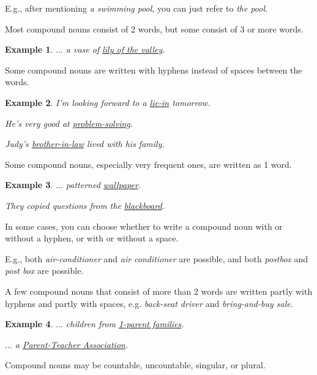 \documentclass[oneside]{book}
\numberwithin{equation}{section}
\newtheorem{example}{Example}[section]
\begin{document}
E.g., after mentioning \textit{a swimming pool}, you can just refer to \textit{the pool}.

%
Most compound nouns consist of 2 words, but some consist of 3 or more words.
\begin{example}
    $\ldots$ a vase of \underline{lily of the valley}.
\end{example}
%
\noindent{} Some compound nouns are written with hyphens instead of spaces between the words.
\begin{example}
    I'm looking forward to a \underline{lie-in} tomorrow.
    
    He's very good at \underline{problem-solving}.
    
    Judy's \underline{brother-in-law} lived with his family.
\end{example}
Some compound nouns, especially very frequent ones, are written as 1 word.
\begin{example}
    $\ldots$ patterned \underline{wallpaper}.
    
    They copied questions from the \underline{blackboard}.
\end{example}
In some cases, you can choose whether to write a compound noun with or without a hyphen, or with or without a space.

E.g., both \textit{air-conditioner} and \textit{air conditioner} are possible, and both \textit{postbox} and \textit{post box} are possible.

%
A few compound nouns that consist of more than 2 words are written partly with hyphens and partly with spaces, e.g. \textit{back-seat driver} and \textit{bring-and-buy sale}.
\begin{example}
    $\ldots$ children from \underline{1-parent families}.
    
    $\ldots$ a \underline{Parent-Teacher Association}.
\end{example}
%
\noindent{} Compound nouns may be countable, uncountable, singular, or plural.
\end{document}
